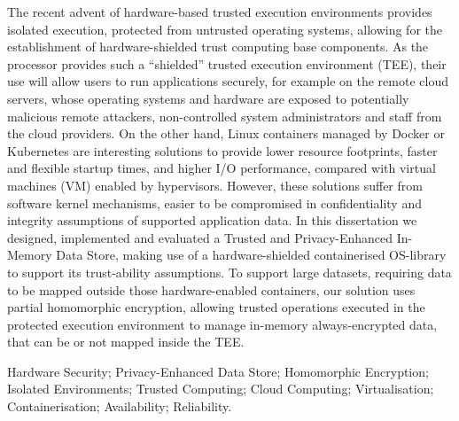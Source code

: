 The recent advent of hardware-based trusted execution environments provides isolated execution, protected from untrusted operating systems, allowing for the establishment of hardware-shielded trust computing base components. As the processor provides such a “shielded” trusted execution environment (TEE), their use will allow users to run applications securely, for example on the remote cloud servers, whose operating systems and hardware are exposed to potentially malicious remote attackers, non-controlled system administrators and staff from the cloud providers. On the other hand, Linux containers managed by Docker or Kubernetes are interesting solutions to provide lower resource footprints, faster and flexible startup times, and higher I/O performance, compared with virtual machines (VM) enabled by hypervisors. However, these solutions suffer from software kernel mechanisms, easier to be compromised in confidentiality and integrity assumptions of supported application data.
In this dissertation we designed, implemented and evaluated a Trusted and Privacy-Enhanced In-Memory Data Store, making use of a hardware-shielded containerised OS-library to support its trust-ability assumptions. To support large datasets, requiring data to be mapped outside those hardware-enabled containers, our solution uses partial homomorphic encryption, allowing trusted operations executed in the protected execution environment to manage in-memory always-encrypted data, that can be or not mapped inside the TEE.

\begin{keywords}
Hardware Security; Privacy-Enhanced Data Store; Homomorphic Encryption; Isolated Environments; Trusted Computing; Cloud Computing; Virtualisation; Containerisation; Availability; Reliability.
\end{keywords} 
